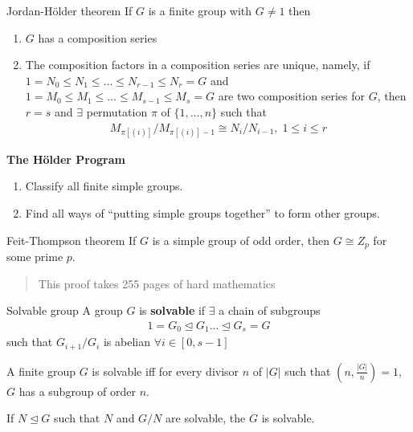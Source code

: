 \documentclass[titlepage, 12pt]{book}
\begin{document}
\begin{theorem}{Jordan-H\"older theorem}{}
    If $G$ is a finite group with $G\neq 1$ then
    \begin{enumerate}
        \item $G$ has a composition series
        \item The composition factors in a composition series are unique,
            namely, if $1 = N_0\le N_1\le\dots\le N_{r-1}\le N_r = G$ and $1 =
            M_0\le M_1\le\dots\le M_{s-1}\le M_s = G$ are two composition series
            for $G$, then $r = s$ and $\exists$ permutation $\pi$ of
            $\{1,\dots,n\}$ such that
            \begin{gather*}
                M_{\pi[(i)]}/M_{\pi[(i)] - 1}\cong N_i/N_{i - 1},\; 1\le i\le r
            \end{gather*}
    \end{enumerate}
\end{theorem}
\begin{center}
    \large{\textbf{The H\"older Program}}
    \begin{enumerate}
        \item Classify all finite simple groups.
        \item Find all ways of ``putting simple groups together'' to form other
            groups.
    \end{enumerate}
\end{center}
\begin{theorem}{Feit-Thompson theorem}{}
    If $G$ is a simple group of odd order, then $G\cong Z_p$ for some prime
    $p$.
\end{theorem}
\begin{quotation}
This proof takes 255 pages of hard mathematics
\end{quotation}
\begin{definition}{Solvable group}{}
    A group $G$ is \textbf{solvable} if $\exists$ a chain of subgroups
    \begin{gather*}
        1 = G_0\trianglelefteq G_1\dots\trianglelefteq G_s = G
    \end{gather*}
    such that $G_{i+1}/G_i$ is abelian $\forall i\in[0, s - 1]$
\end{definition}
\begin{theorem}{}{}
    A finite group $G$ is solvable iff for every divisor $n$ of $|G|$ such that
    $(n, \frac{|G|}{n}) = 1$, $G$ has a subgroup of order $n$.
\end{theorem}
\begin{proposition}{}{}
    If $N\trianglelefteq G$ such that $N$ and $G/N$ are solvable, the $G$ is
    solvable.
\end{proposition}
\end{document}

